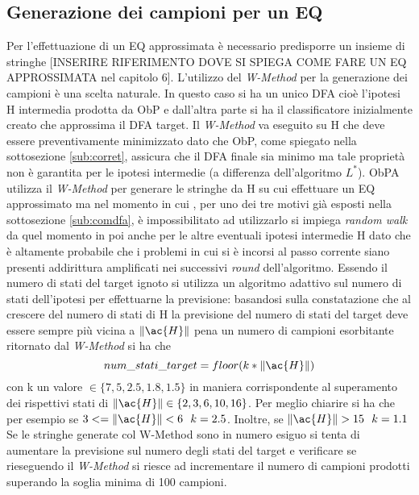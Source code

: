 \subsection[Gen. camp. per EQ]{Generazione dei campioni per un EQ}
\label{sub:ceq}
Per l'effettuazione di un \ac{EQ} approssimata è necessario predisporre un insieme di stringhe [INSERIRE RIFERIMENTO DOVE SI SPIEGA COME FARE UN EQ APPROSSIMATA nel capitolo 6]. L'utilizzo del \textit{W-Method} per la generazione dei campioni è una scelta naturale. In questo caso si ha un unico \ac{DFA} cioè l'ipotesi \ac{H} intermedia prodotta da \ac{ObP} e dall'altra parte si ha il classificatore inizialmente creato che approssima il \ac{DFA} target. Il \textit{W-Method} va eseguito su \ac{H} che deve essere preventivamente minimizzato dato che \ac{ObP}, come spiegato nella sottosezione \ref{sub:corret},  assicura che il \ac{DFA} finale sia minimo ma tale proprietà non è garantita per le ipotesi intermedie (a differenza dell'algoritmo $L^{*}$). \ac{ObPA} utilizza il \textit{W-Method} per generare le stringhe da \ac{H} su cui effettuare un \ac{EQ} approssimato ma nel momento in cui , per uno dei tre motivi già esposti nella sottosezione \ref{sub:comdfa}, è impossibilitato ad utilizzarlo si impiega \textit{random walk} da quel momento in poi anche per le altre eventuali ipotesi intermedie \ac{H} dato che è altamente probabile che i problemi in cui si è incorsi al passo corrente siano presenti addirittura amplificati nei successivi \textit{round} dell'algoritmo.  Essendo il numero di stati del target ignoto si utilizza un algoritmo adattivo sul numero di stati dell'ipotesi per effettuarne la previsione: basandosi sulla constatazione che al crescere del numero di stati di \ac{H} la previsione del numero di stati del target deve essere sempre più vicina a $\norma{\ac{H}}$ pena un numero di campioni esorbitante ritornato dal \textit{W-Method} si ha che 
\begin{equation*}
num\_stati\_target = floor(k * \norma{\ac{H}})
\end{equation*}
con k un valore $\in \{7,5,2.5,1.8,1.5\}$ in maniera corrispondente al superamento dei rispettivi stati di $\norma{\ac{H}} \in \{2,3,6,10,16\}$. Per meglio chiarire si ha che per esempio se $3<=\norma{\ac{H}}<6  \: \: \: k=2.5$.  Inoltre, se  $\norma{\ac{H}}>15 \: \: \: k=1.1$ 
Se le stringhe generate col W-Method sono in numero esiguo si tenta di aumentare la previsione sul numero degli stati del target e verificare se rieseguendo il \textit{W-Method} si riesce ad incrementare il numero di campioni prodotti superando la soglia minima di 100 campioni.


